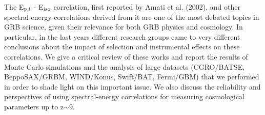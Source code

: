 


\bigskip



\bigskip

\noindent The E$_{\rm p,i}$ - E$_{\rm iso}$ correlation, first reported by Amati et al. (2002), and other spectral-energy correlations derived from it are one of the most debated topics in GRB science, given their relevance for both GRB physics and cosmology. In particular, in the last years different research groups came to very different conclusions about the impact of selection and instrumental effects on these correlations. We give a critical review of these works and report the results of Monte Carlo simulations and the analysis of large datasets (CGRO/BATSE, BeppoSAX/GRBM, WIND/Konus, Swift/BAT, Fermi/GBM) that we performed in order to shade light on this important issue. We also discuss the reliability and perspectives of using spectral-energy correlations for measuring cosmological parameters up to z$\sim$9.


